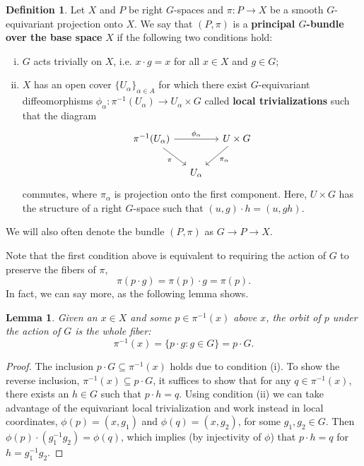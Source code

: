 \documentclass{book}
\theoremstyle{plain}
\newtheorem{lem}[thm]{Lemma}
\theoremstyle{definition}
\newtheorem{defn}{Definition}
\theoremstyle{remark}
\begin{document}
\begin{defn}
    Let $X$ and $P$ be right $G$-spaces and $\pi: P\to X$ be a smooth $G$-equivariant projection onto $X$.
    We say that $(P,\pi)$ is a \textbf{principal $G$-bundle over the base space} $X$ if the following two conditions hold:
    \begin{enumerate}[(i)]
        \item $G$ acts trivially on $X$, i.e. $x\cdot g=x$ for all $x\in X$ and $g\in G$;
        \item $X$ has an open cover $\{U_\alpha\}_{\alpha\in A}$ for which there exist $G$-equivariant diffeomorphisms $\phi_\alpha:\pi^{-1}(U_\alpha)\to U_\alpha\times G$ called \textbf{local trivializations} such that the diagram
            \[\begin{tikzcd}[column sep=small]
                \pi^{-1}(U_\alpha)\arrow[swap]{dr}{\pi}\arrow{rr}{\phi_\alpha}&&U\times G\arrow{dl}{\pi_\alpha}\\
                &U_\alpha&
            \end{tikzcd}\]
            commutes, where $\pi_\alpha$ is projection onto the first component. Here, $U\times G$ has the structure of a right $G$-space such that $(u,g)\cdot h=(u,gh)$.
    \end{enumerate}
    We will also often denote the bundle $(P,\pi)$ as $G\to P\to X$.
\end{defn}

Note that the first condition above is equivalent to requiring the action of $G$ to preserve the fibers of $\pi$,
\[\pi(p\cdot g)=\pi(p)\cdot g=\pi(p).\]
In fact, we can say more, as the following lemma shows.

\begin{lem}
    Given an $x\in X$ and some $p\in\pi^{-1}(x)$ above $x$, the orbit of $p$ under the action of $G$ is the whole fiber:
    \[\pi^{-1}(x)=\{p\cdot g: g\in G\}=p\cdot G.\]
\end{lem}
\begin{proof}
    The inclusion $p\cdot G\subseteq \pi^{-1}(x)$ holds due to condition (i). To show the reverse inclusion, $\pi^{-1}(x)\subseteq p\cdot G$, it suffices to show that for any $q\in\pi^{-1}(x)$, there exists an $h\in G$ such that $p\cdot h=q$. Using condition (ii) we can take advantage of the equivariant local trivialization and work instead in local coordinates, $\phi(p)=(x, g_1)$ and $\phi(q)=(x,g_2)$, for some $g_1,g_2\in G$. Then $\phi(p)\cdot (g_1^{-1}g_2)=\phi(q)$, which implies (by injectivity of $\phi$) that $p\cdot h=q$ for $h=g_1^{-1}g_2$.
\end{proof}
\end{document}

